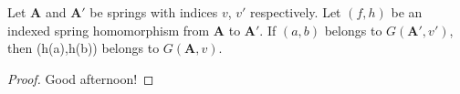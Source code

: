 %

\begin{proposition}
  Let $\boldsymbol{A}$ and $\boldsymbol{A'}$ be springs with indices $v$, $v'$
  respectively. Let $(f,h)$ be an indexed spring homomorphism from $\boldsymbol{A}$
  to $\boldsymbol{A'}$. If $(a,b)$ belongs to $G(\boldsymbol{A'},v')$, then
  (h(a),h(b)) belongs to $G(\boldsymbol{A},v)$.
\end{proposition}
\begin{proof}
  Good afternoon!
\end{proof}
